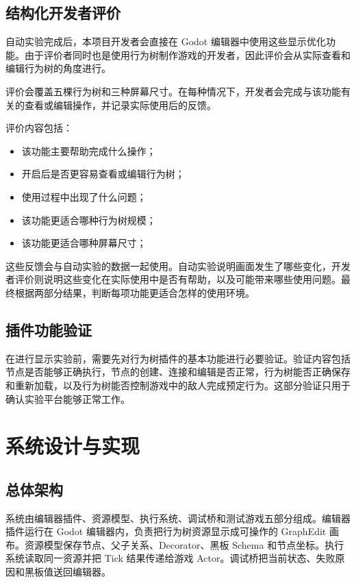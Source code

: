 \documentclass[11pt,a4paper,oneside,extrafontsizes]{memoir}
\begin{document}
\section{结构化开发者评价}

自动实验完成后，本项目开发者会直接在 Godot 编辑器中使用这些显示优化功能。由于评价者同时也是使用行为树制作游戏的开发者，因此评价会从实际查看和编辑行为树的角度进行。

评价会覆盖五棵行为树和三种屏幕尺寸。在每种情况下，开发者会完成与该功能有关的查看或编辑操作，并记录实际使用后的反馈。

评价内容包括：

\begin{itemize}[leftmargin=*]
\item 该功能主要帮助完成什么操作；
\item 开启后是否更容易查看或编辑行为树；
\item 使用过程中出现了什么问题；
\item 该功能更适合哪种行为树规模；
\item 该功能更适合哪种屏幕尺寸；
\end{itemize}

这些反馈会与自动实验的数据一起使用。自动实验说明画面发生了哪些变化，开发者评价则说明这些变化在实际使用中是否有帮助，以及可能带来哪些使用问题。最终根据两部分结果，判断每项功能更适合怎样的使用环境。

\section{插件功能验证}

在进行显示实验前，需要先对行为树插件的基本功能进行必要验证。验证内容包括节点是否能够正确执行，节点的创建、连接和编辑是否正常，行为树能否正确保存和重新加载，以及行为树能否控制游戏中的敌人完成预定行为。这部分验证只用于确认实验平台能够正常工作。

\chapter{系统设计与实现}

\section{总体架构}

系统由编辑器插件、资源模型、执行系统、调试桥和测试游戏五部分组成。编辑器插件运行在 Godot 编辑器内，负责把行为树资源显示成可操作的 GraphEdit 画布。资源模型保存节点、父子关系、Decorator、黑板 Schema 和节点坐标。执行系统读取同一资源并把 Tick 结果传递给游戏 Actor。调试桥把当前状态、失败原因和黑板值送回编辑器。
\end{document}
